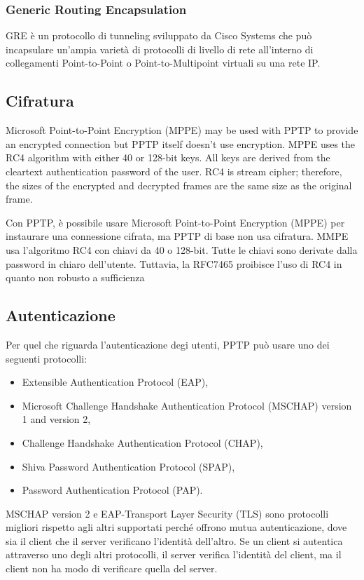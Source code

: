 \subsubsection{Generic Routing Encapsulation}
GRE è un protocollo di tunneling sviluppato da Cisco Systems che può incapsulare un'ampia varietà di protocolli di livello di rete all'interno di collegamenti Point-to-Point o Point-to-Multipoint virtuali su una rete IP.

\subsection{Cifratura}
Microsoft Point-to-Point Encryption (MPPE) may be used with PPTP to provide an encrypted connection but PPTP itself doesn't use encryption. MPPE uses the RC4 algorithm with either 40 or 128-bit keys. All keys are derived from the cleartext authentication password of the user. RC4 is stream cipher; therefore, the sizes of the encrypted and decrypted frames are the same size as the original frame.

Con PPTP, è possibile usare Microsoft Point-to-Point Encryption (MPPE) per instaurare una connessione cifrata, ma PPTP di base non usa cifratura. MMPE usa l'algoritmo RC4 con chiavi da 40 o 128-bit. Tutte le chiavi sono derivate dalla password in chiaro dell'utente. Tuttavia, la RFC7465 proibisce l'uso di RC4 in quanto non robusto a sufficienza

\subsection{Autenticazione}
Per quel che riguarda l'autenticazione degi utenti, PPTP può usare uno dei seguenti protocolli:
\begin{itemize}
    \item Extensible Authentication Protocol (EAP),
    \item Microsoft Challenge Handshake Authentication Protocol (MSCHAP) version 1 and version 2,
    \item Challenge Handshake Authentication Protocol (CHAP),
    \item Shiva Password Authentication Protocol (SPAP),
    \item Password Authentication Protocol (PAP).
\end{itemize}

MSCHAP version 2 e EAP-Transport Layer Security (TLS) sono protocolli migliori rispetto agli altri supportati perché offrono mutua autenticazione, dove sia il client che il server verificano l'identità dell'altro. Se un client si autentica attraverso uno degli altri protocolli, il server verifica l'identità del client, ma il client non ha modo di verificare quella del server.

